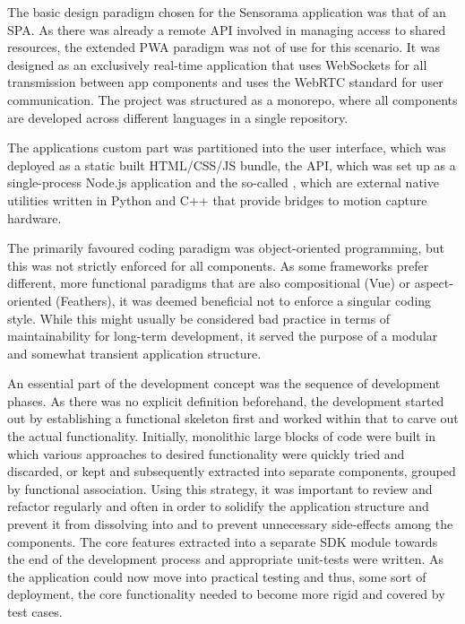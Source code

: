 The basic design paradigm chosen for the Sensorama application was that of an \ac{SPA}.
As there was already a remote API involved in managing access to shared resources, the extended \ac{PWA} paradigm was not of use for this scenario.
It was designed as an exclusively real-time application that uses WebSockets for all transmission between app components and uses the WebRTC standard for user communication.
The project was structured as a monorepo, where all components are developed across different languages in a single repository.

The application\textquotesingle s custom part was partitioned into the user interface, which was deployed as a static built \ac{HTML}/\ac{CSS}/\ac{JS} bundle, the \ac{API}, which was set up as a single-process Node.js application and the so-called , which are external native utilities written in Python and C++ that provide bridges to motion capture hardware.

The primarily favoured coding paradigm was object-oriented programming, but this was not strictly enforced for all components.
As some frameworks prefer different, more functional paradigms that are also compositional (Vue) or aspect-oriented (Feathers), it was deemed beneficial not to enforce a singular coding style.
While this might usually be considered bad practice in terms of maintainability for long-term development, it served the purpose of a modular and somewhat transient  application structure.

An essential part of the development concept was the sequence of development phases.
As there was no explicit definition beforehand, the development started out by establishing a functional skeleton first and worked within that to carve out the actual functionality.
Initially, monolithic large blocks of code were built in which various approaches to desired functionality were quickly tried and discarded, or kept and subsequently extracted into separate components, grouped by functional association.
Using this strategy, it was important to review and refactor regularly and often in order to solidify the application structure and prevent it from dissolving into  and to prevent unnecessary side-effects among the components.
The core features extracted into a separate \ac{SDK} module towards the end of the development process and appropriate unit-tests were written.
As the application could now move into practical testing and thus, some sort of  deployment, the core functionality needed to become more rigid and covered by test cases.

